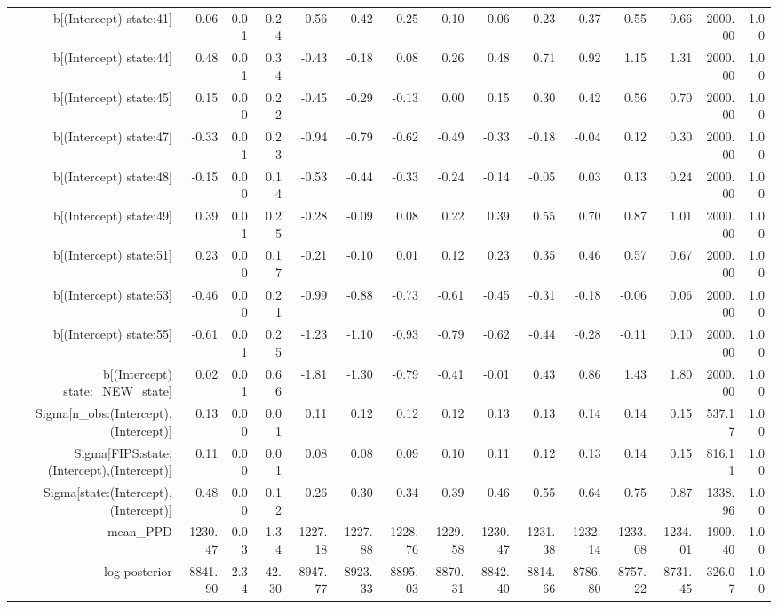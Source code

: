 \begin{table}[ht]
\begin{tabular}{rrrrrrrrrrrrrrr}
  b[(Intercept) state:41] & 0.06 & 0.01 & 0.24 & -0.56 & -0.42 & -0.25 & -0.10 & 0.06 & 0.23 & 0.37 & 0.55 & 0.66 & 2000.00 & 1.00 \\ 
  b[(Intercept) state:44] & 0.48 & 0.01 & 0.34 & -0.43 & -0.18 & 0.08 & 0.26 & 0.48 & 0.71 & 0.92 & 1.15 & 1.31 & 2000.00 & 1.00 \\ 
  b[(Intercept) state:45] & 0.15 & 0.00 & 0.22 & -0.45 & -0.29 & -0.13 & 0.00 & 0.15 & 0.30 & 0.42 & 0.56 & 0.70 & 2000.00 & 1.00 \\ 
  b[(Intercept) state:47] & -0.33 & 0.01 & 0.23 & -0.94 & -0.79 & -0.62 & -0.49 & -0.33 & -0.18 & -0.04 & 0.12 & 0.30 & 2000.00 & 1.00 \\ 
  b[(Intercept) state:48] & -0.15 & 0.00 & 0.14 & -0.53 & -0.44 & -0.33 & -0.24 & -0.14 & -0.05 & 0.03 & 0.13 & 0.24 & 2000.00 & 1.00 \\ 
  b[(Intercept) state:49] & 0.39 & 0.01 & 0.25 & -0.28 & -0.09 & 0.08 & 0.22 & 0.39 & 0.55 & 0.70 & 0.87 & 1.01 & 2000.00 & 1.00 \\ 
  b[(Intercept) state:51] & 0.23 & 0.00 & 0.17 & -0.21 & -0.10 & 0.01 & 0.12 & 0.23 & 0.35 & 0.46 & 0.57 & 0.67 & 2000.00 & 1.00 \\ 
  b[(Intercept) state:53] & -0.46 & 0.00 & 0.21 & -0.99 & -0.88 & -0.73 & -0.61 & -0.45 & -0.31 & -0.18 & -0.06 & 0.06 & 2000.00 & 1.00 \\ 
  b[(Intercept) state:55] & -0.61 & 0.01 & 0.25 & -1.23 & -1.10 & -0.93 & -0.79 & -0.62 & -0.44 & -0.28 & -0.11 & 0.10 & 2000.00 & 1.00 \\ 
  b[(Intercept) state:\_NEW\_state] & 0.02 & 0.01 & 0.66 & -1.81 & -1.30 & -0.79 & -0.41 & -0.01 & 0.43 & 0.86 & 1.43 & 1.80 & 2000.00 & 1.00 \\ 
  Sigma[n\_obs:(Intercept),(Intercept)] & 0.13 & 0.00 & 0.01 & 0.11 & 0.12 & 0.12 & 0.12 & 0.13 & 0.13 & 0.14 & 0.14 & 0.15 & 537.17 & 1.00 \\ 
  Sigma[FIPS:state:(Intercept),(Intercept)] & 0.11 & 0.00 & 0.01 & 0.08 & 0.08 & 0.09 & 0.10 & 0.11 & 0.12 & 0.13 & 0.14 & 0.15 & 816.11 & 1.00 \\ 
  Sigma[state:(Intercept),(Intercept)] & 0.48 & 0.00 & 0.12 & 0.26 & 0.30 & 0.34 & 0.39 & 0.46 & 0.55 & 0.64 & 0.75 & 0.87 & 1338.96 & 1.00 \\ 
  mean\_PPD & 1230.47 & 0.03 & 1.34 & 1227.18 & 1227.88 & 1228.76 & 1229.58 & 1230.47 & 1231.38 & 1232.14 & 1233.08 & 1234.01 & 1909.40 & 1.00 \\ 
  log-posterior & -8841.90 & 2.34 & 42.30 & -8947.77 & -8923.33 & -8895.03 & -8870.31 & -8842.40 & -8814.66 & -8786.80 & -8757.22 & -8731.45 & 326.07 & 1.00 \\ 
   \hline
\end{tabular}
\end{table}

